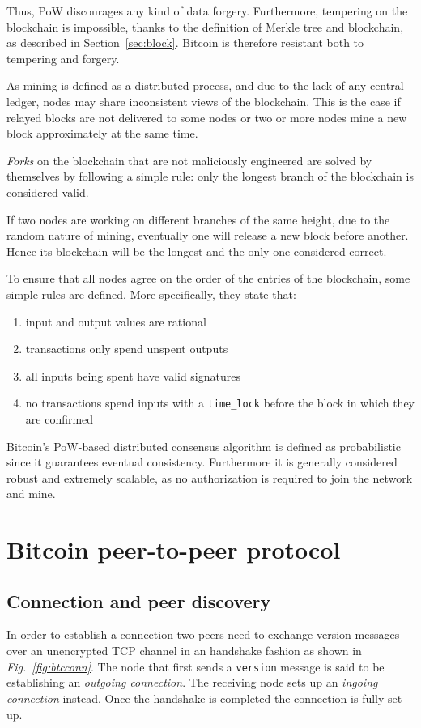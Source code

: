 \documentclass[12pt, letterpaper, twoside]{article}
\begin{document}
Thus, PoW discourages any kind of data forgery. Furthermore, tempering on the blockchain is impossible, thanks to the definition of Merkle tree and blockchain, as described in Section~\ref{sec:block}. Bitcoin is therefore resistant both to tempering and forgery.

As mining is defined as a distributed process, and due to the lack of any central ledger, nodes may share inconsistent views of the blockchain. This is the case if relayed blocks are not delivered to some nodes or two or more nodes mine a new block approximately at the same time.

\emph{Forks} on the blockchain that are not maliciously engineered are solved by themselves by following a simple rule: only the longest branch of the blockchain is considered valid.

If two nodes are working on different branches of the same height, due to the random nature of mining, eventually one will release a new block before another. Hence its blockchain will be the longest and the only one considered correct.

To ensure that all nodes agree on the order of the entries of the blockchain, some simple rules are defined. More specifically, they state that:
\begin{enumerate}
	\item input and output values are rational
	\item transactions only spend unspent outputs
	\item all inputs being spent have valid signatures
	\item no transactions spend inputs with a \texttt{time\_lock} before the block in which they are confirmed
\end{enumerate} 
 
Bitcoin's PoW-based distributed consensus algorithm is defined as probabilistic since it guarantees eventual consistency. Furthermore it is generally considered robust and extremely scalable, as no authorization is required to join the network and mine.


\section{Bitcoin peer-to-peer protocol}\label{sec:netintro}
\subsection{Connection and peer discovery}\label{sec:peerdisc}
In order to establish a connection two peers need to exchange version messages over an unencrypted TCP channel in an handshake fashion as shown in \emph{Fig.~\ref{fig:btcconn}}. The node that first sends a \texttt{version} message is said to be establishing an \emph{outgoing connection}. The receiving node sets up an \emph{ingoing connection} instead. Once the handshake is completed the connection is fully set up.
\end{document}
